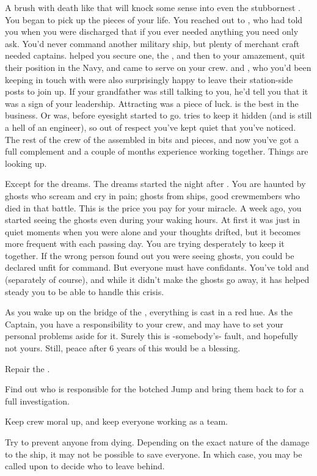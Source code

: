 \documentclass[char]{TMFHope}
\begin{document}
A brush with death like that will knock some sense into even the stubbornest \cCap{\human}. You began to pick up the pieces of your life. You reached out to \cXO{}, who had told you when you were discharged that if you ever needed anything you need only ask. You'd never command another military ship, but plenty of merchant craft needed captains. \cXO{} helped you secure one, the \pNew{}, and then to your amazement, quit their position in the Navy, and came to serve on your crew. \cMed{} and \cSci{}, who you'd been keeping in touch with were also surprisingly happy to leave their station-side posts to join up. If your grandfather was still talking to you, he'd tell you that it was a sign of your leadership. Attracting \cEng{} was a piece of luck. \cEng{\They} is the best in the business. Or was, before \cEng{\their} eyesight started to go. \cEng{} tries to keep it hidden (and \cEng{\they} is still a hell of an engineer), so out of respect you've kept quiet that you've noticed. The rest of the crew of the \pNew{} assembled in bits and pieces, and now you've got a full complement and a couple of months experience working together. Things are looking up.

Except for the dreams. The dreams started the night after \pBattle{}. You are haunted by ghosts who scream and cry in pain; ghosts from \pPlan{} ships, good crewmembers who died in that battle. This is the price you pay for your miracle.	A week ago, you started seeing the ghosts even during your waking hours. At first it was just in quiet moments when you were alone and your thoughts drifted, but it becomes more frequent with each passing day. You are trying desperately to keep it together. If the wrong person found out you were seeing ghosts, you could be declared unfit for command. But everyone must have confidants. You've told \cMed{} and \cSci{} (separately of course), and while it didn't make the ghosts go away, it has helped steady you to be able to handle this crisis. 

As you wake up on the bridge of the \pNew{}, everything is cast in a red hue. As the Captain, you have a responsibility to your crew, and may have to set your personal problems aside for it. Surely this is -somebody's- fault, and hopefully not yours. Still, peace after 6 years of this would be a blessing.

\begin{itemz}[Goals]
	\item Repair the \pNew{}.
	\item Find out who is responsible for the botched Jump and bring them back to \pHome{} for a full investigation.
	\item Keep crew moral up, and keep everyone working as a team.
	\item Try to prevent anyone from dying. Depending on the exact nature of the damage to the ship, it may not be possible to save everyone. In which case, you may be called upon to decide who to leave behind.
\end{itemz}
\end{document}
